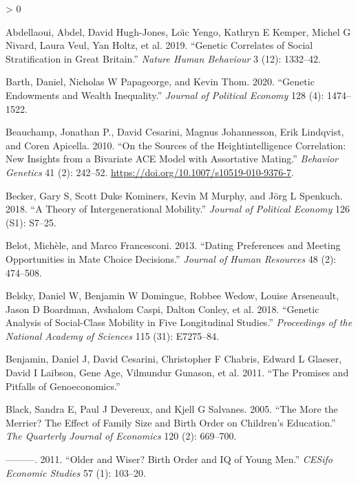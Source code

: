 \documentclass[
]{article}
\newlength{\cslhangindent}
\newenvironment{CSLReferences}[2] %
 {%
  \setlength{\parindent}{0pt}
  \ifodd #1 \everypar{\setlength{\hangindent}{\cslhangindent}}\ignorespaces\fi
  \ifnum #2 > 0
  \setlength{\parskip}{#2\baselineskip}
  \fi
 }%
 {}
\begin{document}
\hypertarget{refs}{}
\begin{CSLReferences}{1}{0}
\leavevmode\hypertarget{ref-abdellaoui2019genetic}{}%
Abdellaoui, Abdel, David Hugh-Jones, Loı̈c Yengo, Kathryn E Kemper, Michel G Nivard, Laura Veul, Yan Holtz, et al. 2019. {``Genetic Correlates of Social Stratification in Great Britain.''} \emph{Nature Human Behaviour} 3 (12): 1332--42.

\leavevmode\hypertarget{ref-barth2020genetic}{}%
Barth, Daniel, Nicholas W Papageorge, and Kevin Thom. 2020. {``Genetic Endowments and Wealth Inequality.''} \emph{Journal of Political Economy} 128 (4): 1474--1522.

\leavevmode\hypertarget{ref-Beauchamp_2010}{}%
Beauchamp, Jonathan P., David Cesarini, Magnus Johannesson, Erik Lindqvist, and Coren Apicella. 2010. {``On the Sources of the Height{{}}intelligence Correlation: New Insights from a Bivariate {ACE} Model with Assortative Mating.''} \emph{Behavior Genetics} 41 (2): 242--52. \url{https://doi.org/10.1007/s10519-010-9376-7}.

\leavevmode\hypertarget{ref-becker2018theory}{}%
Becker, Gary S, Scott Duke Kominers, Kevin M Murphy, and Jörg L Spenkuch. 2018. {``A Theory of Intergenerational Mobility.''} \emph{Journal of Political Economy} 126 (S1): S7--25.

\leavevmode\hypertarget{ref-belot2013dating}{}%
Belot, Michèle, and Marco Francesconi. 2013. {``Dating Preferences and Meeting Opportunities in Mate Choice Decisions.''} \emph{Journal of Human Resources} 48 (2): 474--508.

\leavevmode\hypertarget{ref-belsky2018genetic}{}%
Belsky, Daniel W, Benjamin W Domingue, Robbee Wedow, Louise Arseneault, Jason D Boardman, Avshalom Caspi, Dalton Conley, et al. 2018. {``Genetic Analysis of Social-Class Mobility in Five Longitudinal Studies.''} \emph{Proceedings of the National Academy of Sciences} 115 (31): E7275--84.

\leavevmode\hypertarget{ref-benjamin2011promises}{}%
Benjamin, Daniel J, David Cesarini, Christopher F Chabris, Edward L Glaeser, David I Laibson, Gene Age, Vilmundur Gunason, et al. 2011. {``The Promises and Pitfalls of Genoeconomics.''}

\leavevmode\hypertarget{ref-black2005more}{}%
Black, Sandra E, Paul J Devereux, and Kjell G Salvanes. 2005. {``The More the Merrier? The Effect of Family Size and Birth Order on Children's Education.''} \emph{The Quarterly Journal of Economics} 120 (2): 669--700.

\leavevmode\hypertarget{ref-black2011older}{}%
---------. 2011. {``Older and Wiser? Birth Order and IQ of Young Men.''} \emph{CESifo Economic Studies} 57 (1): 103--20.


\end{CSLReferences}
\end{document}
